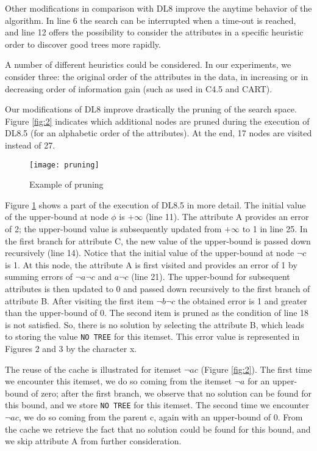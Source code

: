 Other modifications in comparison with DL8 improve the anytime behavior of the algorithm. In line 6 the search can be interrupted when a time-out is reached, and line 12 offers the possibility to consider the attributes in a specific heuristic order to discover good trees more rapidly.

A number of different heuristics could be considered. In our experiments, we consider three: the original order of the attributes in the data, in increasing or in decreasing order of information gain (such as used in C4.5 and CART).

Our modifications of DL8 improve drastically the pruning of the search space. Figure \ref{fig:2} indicates which additional nodes are pruned during the execution of DL8.5 (for an alphabetic order of the attributes). At the end, 17 nodes are visited instead of 27.

\begin{figure}
	\texttt{[image: pruning]}
	\caption{ Example of pruning}
	\label{fig:3}
\end{figure}

Figure \ref{fig:3} shows a part of the execution of DL8.5 in more detail. The initial value of the upper-bound at node $\phi$ is $+\infty$ (line 11). The attribute A provides an error of 2; the upper-bound value is subsequently updated from $+\infty$ to 1 in line 25. In the first branch for attribute C, the new value of the upper-bound is passed down recursively (line 14). Notice that the initial value of the upper-bound at node $\neg c$ is 1. At this node, the attribute A is first visited and provides an error of 1 by summing errors of $\neg a\neg c$ and $a\neg c$ (line 21). The upper-bound for subsequent attributes is then updated to 0 and passed down recursively to the first branch of attribute B. After visiting the first item $\neg b\neg c$ the obtained error is 1 and greater than the upper-bound of 0. The second item is pruned as the condition of line 18 is not satisfied. So, there is no solution by selecting the attribute B, which leads to storing the value \verb|NO TREE| for this itemset. This error value is represented in Figures 2 and 3 by the character x.

The reuse of the cache is illustrated for itemset $\neg ac$ (Figure \ref{fig:2}). The first time we encounter this itemset, we do so coming from the itemset $\neg a$ for an upper-bound of zero; after the first branch, we observe that no solution can be found for this bound, and we store \verb|NO TREE| for this itemset. The second time we encounter $\neg ac$, we do so coming from the parent c, again with an upper-bound of 0. From the cache we retrieve the fact that no solution could be found for this bound, and we skip attribute A from further consideration.